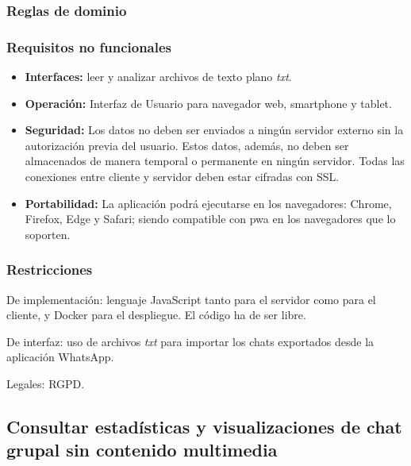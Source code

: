 \subsubsection{Reglas de dominio}



\subsubsection{Requisitos no funcionales}

\begin{itemize}
	\item \textbf{Interfaces:} leer y analizar archivos de texto plano \textit{txt}. 
	
	\item \textbf{Operación:} Interfaz de Usuario para navegador web, smartphone y tablet.
	
	\item \textbf{Seguridad:} Los datos no deben ser enviados a ningún servidor externo sin la autorización previa del usuario. Estos datos, además, no deben ser almacenados de manera temporal o permanente en ningún servidor. Todas las conexiones entre cliente y servidor deben estar cifradas con SSL.
	
	\item \textbf{Portabilidad:} La aplicación podrá ejecutarse en los navegadores: Chrome, Firefox, Edge y Safari; siendo compatible con \acrshort{pwa} en los navegadores que lo soporten.
\end{itemize}

\subsubsection{Restricciones}
De implementación: lenguaje JavaScript tanto para el servidor como para el cliente, y Docker para el despliegue. El código ha de ser libre.

De interfaz: uso de archivos \textit{txt} para importar los chats exportados desde la aplicación WhatsApp. 

Legales: RGPD.










\subsection{Consultar estadísticas y visualizaciones de chat grupal sin contenido multimedia}

